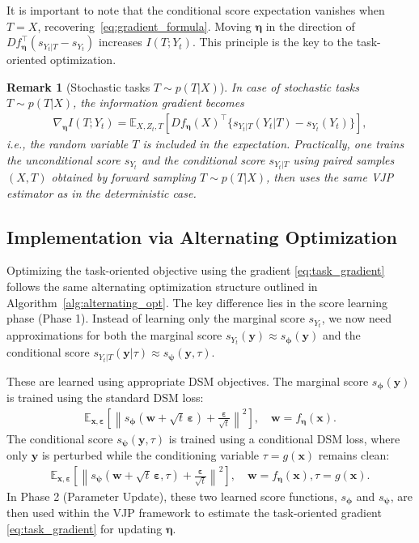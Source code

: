 \documentclass[conference]{IEEEtran}
\newtheorem{remark}{Remark}
\newcommand{\E}{\mathbb{E}}
\newcommand{\Yt}{Y_t}
\newcommand{\sYt}{s_{\Yt}}
\newcommand{\sYtT}{s_{\Yt|T}}
\begin{document}
It is important to note that the conditional score expectation vanishes when $T = X$, recovering~\eqref{eq:gradient_formula}.
Moving $\bm \eta$ in the direction of $D f_{\bm \eta}^\top (\sYtT - \sYt)$ 
increases $I(T; \Yt)$. This principle is the key to the {task-oriented optimization}.

\begin{remark}[Stochastic tasks $T\!\sim\! p(T|X)$] \rm 
In case of stochastic tasks $T\!\sim\! p(T|X)$, the information gradient becomes
\begin{align}
\nabla_{\bm\eta} I(T;Y_t)
=
\E_{X,Z_t,T}\!\left[
D f_{\bm\eta}(X)^{\!\top}
\big\{ s_{Y_t|T}(Y_t|T)-s_{Y_t}(Y_t) \big\}
\right],
\end{align}
i.e., the random variable $T$ is included in the expectation.
Practically, one trains the unconditional score $s_{Y_t}$ and the conditional score $s_{Y_t|T}$ using paired samples $(X,T)$ obtained by forward sampling $T\!\sim\!p(T|X)$, 
then uses the same VJP estimator as in the deterministic case.
\end{remark}

\subsection{Implementation via Alternating Optimization}
\label{subsec:task_implementation}

Optimizing the task-oriented objective using the gradient \eqref{eq:task_gradient} 
follows the same alternating optimization structure outlined 
in Algorithm~\ref{alg:alternating_opt}. 
The key difference lies in the score learning phase (Phase 1). 
Instead of learning only the marginal score $s_{Y_t}$, 
we now need approximations for both the marginal score
 $s_{Y_t}(\bm y) \approx s_{\bm \phi}(\bm y)$ and 
 the conditional score $s_{Y_t|T}(\bm y|\tau) \approx s_{\bm \psi}(\bm y, \tau)$.

These are learned using appropriate DSM objectives. 
The marginal score $s_{\bm \phi}(\bm y)$ is trained using the standard DSM loss:
\begin{align}
\E_{\bm{x}, \bm{\varepsilon}}\left[\left\|s_{\bm \phi}(\bm{w} + \sqrt{t}\,\bm{\varepsilon}) + \frac{\bm{\varepsilon}}{\sqrt{t}}\right\|^2\right], \quad \bm w = f_{\bm \eta}(\bm x).
\label{eq:unconditional_dsm}
\end{align}
The conditional score $s_{\bm \psi}(\bm y, \tau)$ is trained using a conditional 
DSM loss, where only $\bm y$ is perturbed while 
the conditioning variable $\tau=g(\bm x)$ remains clean:
\begin{align}
\E_{\bm{x}, \bm{\varepsilon}}\left[\left\|s_{\bm \psi}(\bm{w} + \sqrt{t}\,\bm{\varepsilon}, \tau) + \frac{\bm{\varepsilon}}{\sqrt{t}}\right\|^2\right], \quad \bm w = f_{\bm \eta}(\bm x), \tau = g(\bm x).
\label{eq:conditional_dsm_task}
\end{align}
In Phase 2 (Parameter Update), these two learned score functions, 
$s_{\bm \phi}$ and $s_{\bm \psi}$, are then used within the VJP framework 
to estimate the task-oriented gradient \eqref{eq:task_gradient} for updating $\bm \eta$.
\end{document}
